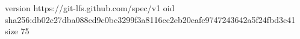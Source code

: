 version https://git-lfs.github.com/spec/v1
oid sha256:db02c27dba088cd9c0bc3299f3a8116cc2eb20eafc9747243642a5f24fbd3c41
size 75
